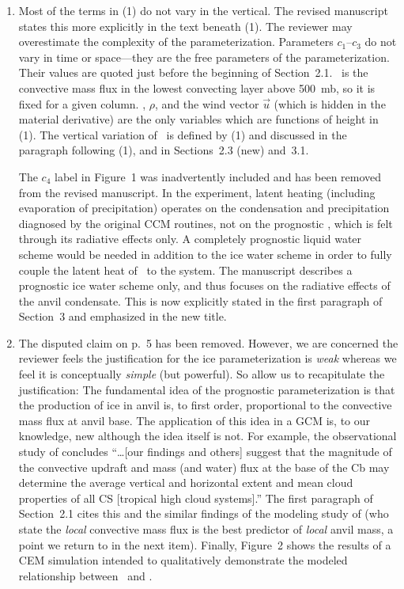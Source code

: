 \documentclass[12pt,twoside]{article}
\begin{document}
\begin{enumerate}

\item Most of the terms in (1) do not vary in the vertical.
The revised manuscript states this more explicitly in the text beneath
(1). 
The reviewer may overestimate the complexity of the parameterization. 
Parameters $c_1$--$c_3$ do not vary in time or space---they are the
free parameters of the parameterization.
Their values are quoted just before the beginning of Section~2.1.
\Mc\ is the convective mass flux in the lowest convecting layer above
500~mb, so it is fixed for a given column.  
\qi, $\rho$, and the wind vector $\vec u$ (which is hidden in the
material derivative) are the only variables which are functions of
height in (1). 
The vertical variation of \qi\ is defined by (1) and discussed in 
the paragraph following (1), and in Sections~2.3 (new) and~3.1.

The $c_4$ label in Figure~1 was inadvertently included and has been
removed from the revised manuscript.  
In the experiment, latent heating (including evaporation of
precipitation) operates on the condensation and precipitation
diagnosed by the original CCM routines, not on the prognostic \qi,
which is felt through its radiative effects only. 
A completely prognostic liquid water scheme would be needed in
addition to the ice water scheme in order to fully couple the latent
heat of \qi\ to the system.
The manuscript describes a prognostic ice water scheme only, and
thus focuses on the radiative effects of the anvil condensate.
This is now explicitly stated in the first paragraph of Section~3 and
emphasized in the new title.


\item The disputed claim on p.~5 has been removed.
However, we are concerned the reviewer feels the justification for the
ice parameterization is \textit{weak} whereas we feel it is
conceptually \textit{simple} (but powerful).  
So allow us to recapitulate the justification:
The fundamental idea of the prognostic parameterization is that the
production of ice in anvil is, to first order, proportional to the
convective mass flux at anvil base.  
The application of this idea in a GCM is, to our knowledge, new
although the idea itself is not.
For example, the observational study of \cite{MaR93} concludes
``\ldots [our findings and others] suggest that the magnitude of the
convective updraft and mass (and water) flux at the base of the Cb may
determine the average vertical and horizontal extent and mean cloud
properties of all CS [tropical high cloud systems].''
The first paragraph of Section~2.1 cites this and the similar findings
of the modeling study of \cite{XuK91} (who state the \textit{local}
convective mass flux is the best predictor of \textit{local} anvil
mass, a point we return to in the next item). 
Finally, Figure~2 shows the results of a CEM simulation intended to
qualitatively demonstrate the modeled relationship between \Mc\ and
\IWPdot.


\end{enumerate}
\end{document}

